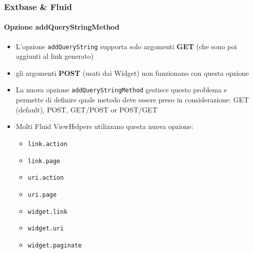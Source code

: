 \begin{frame}[fragile]
	\frametitle{Extbase \& Fluid}
	\framesubtitle{Opzione addQueryStringMethod}

	\begin{itemize}
		\item L'opzione \texttt{addQueryString} supporta solo argomenti \textbf{GET}\newline
			\small(che sono poi aggiunti al link generato)\normalsize
		\item gli argomenti \textbf{POST} (usati dai Widget) non funzionano con questa opzione
		\item La nuova opzione \texttt{addQueryStringMethod} gestisce questo problema e permette di definire quale metodo deve essere preso in considerazione:\newline
			GET (default), POST, GET/POST or POST/GET
		\item Molti Fluid ViewHelpers utilizzano questa nuova opzione:

			\begin{itemize}\smaller
				\item \texttt{link.action}
				\item \texttt{link.page}
				\item \texttt{uri.action}
				\item \texttt{uri.page}
				\item \texttt{widget.link}
				\item \texttt{widget.uri}
				\item \texttt{widget.paginate}
			\end{itemize}

	\end{itemize}

\end{frame}



